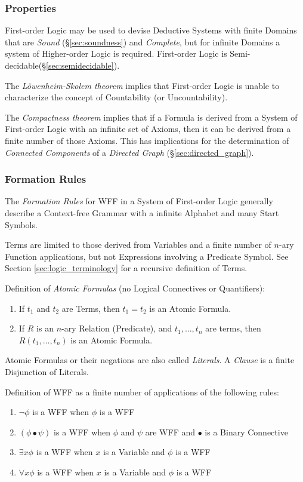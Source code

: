 \subsubsection{Properties}\label{sec:firstorder_properties}

First-order Logic may be used to devise Deductive Systems with finite
Domains that are \emph{Sound} (\S\ref{sec:soundness}) and
\emph{Complete}, but for infinite Domains a system of Higher-order
Logic is required. First-order Logic is
Semi-decidable(\S\ref{sec:semidecidable}).

The \emph{L\"owenheim-Skolem theorem} implies that First-order Logic
is unable to characterize the concept of Countability (or
Uncountability).

The \emph{Compactness theorem} implies that if a Formula is derived
from a System of First-order Logic with an infinite set of Axioms,
then it can be derived from a finite number of those Axioms. This has
implications for the determination of \emph{Connected Components} of a
\emph{Directed Graph} (\S\ref{sec:directed_graph}).

\subsubsection{Formation Rules}\label{sec:formation_rules}

The \emph{Formation Rules} for WFF in a System of First-order Logic
generally describe a Context-free Grammar with a infinite Alphabet and
many Start Symbols.

Terms are limited to those derived from Variables and a finite number
of $n$-ary Function applications, but not Expressions involving a
Predicate Symbol. See Section \ref{sec:logic_terminology} for a recursive
definition of Terms.

Definition of \emph{Atomic Formulas} (no Logical Connectives or Quantifiers):
\begin{enumerate}
\item If $t_1$ and $t_2$ are Terms, then $t_1 = t_2$ is an Atomic Formula.
\item If $R$ is an $n$-ary Relation (Predicate), and $t_1,\ldots,t_n$
  are terms, then $R(t_1,\ldots,t_n)$ is an Atomic Formula.
\end{enumerate}
Atomic Formulas or their negations are also called \emph{Literals}. A
\emph{Clause} is a finite Disjunction of Literals.

Definition of WFF as a finite number of applications of the following rules:
\begin{enumerate}
\item $\neg \phi$ is a WFF when $\phi$ is a WFF
\item $(\phi \bullet \psi)$ is a WFF when $\phi$ and $\psi$ are WFF
  and $\bullet$ is a Binary Connective
\item $\exists x \phi$ is a WFF when $x$ is a Variable and $\phi$ is a WFF
\item $\forall x \phi$ is a WFF when $x$ is a Variable and $\phi$ is a WFF
\end{enumerate}




